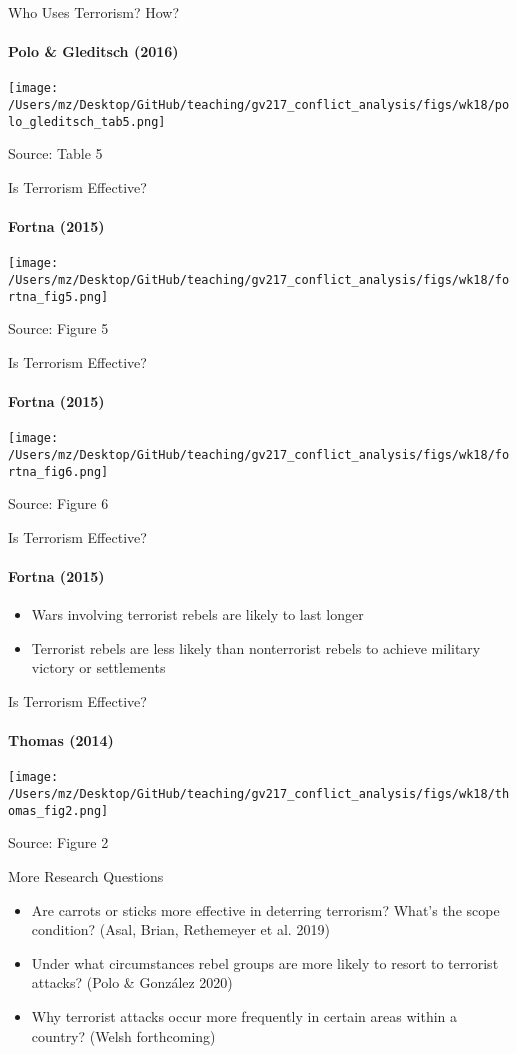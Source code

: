 \documentclass{beamer}
\begin{document}
\begin{frame}{Who Uses Terrorism? How?}
\framesubtitle{Polo \& Gleditsch (2016)}
    \pause
    \begin{center}
        \texttt{[image: /Users/mz/Desktop/GitHub/teaching/gv217\_conflict\_analysis/figs/wk18/polo\_gleditsch\_tab5.png]}
    \end{center}
    \footnotesize Source: Table 5
\end{frame}

\begin{frame}{Is Terrorism Effective?}
\framesubtitle{Fortna (2015)}
    \pause
    \begin{center}
        \texttt{[image: /Users/mz/Desktop/GitHub/teaching/gv217\_conflict\_analysis/figs/wk18/fortna\_fig5.png]}
    \end{center}
    \footnotesize Source: Figure 5
\end{frame}

\begin{frame}{Is Terrorism Effective?}
\framesubtitle{Fortna (2015)}
    \pause
    \begin{center}
        \texttt{[image: /Users/mz/Desktop/GitHub/teaching/gv217\_conflict\_analysis/figs/wk18/fortna\_fig6.png]}
    \end{center}
    \footnotesize Source: Figure 6
\end{frame}

\begin{frame}{Is Terrorism Effective?}
\framesubtitle{Fortna (2015)}
    \begin{itemize}
        \pause\item Wars involving terrorist rebels are likely to last longer
        \pause\item Terrorist rebels are less likely than nonterrorist rebels to achieve military victory or settlements
    \end{itemize}
\end{frame}

\begin{frame}{Is Terrorism Effective?}
\framesubtitle{Thomas (2014)}
    \pause
    \begin{center}
        \texttt{[image: /Users/mz/Desktop/GitHub/teaching/gv217\_conflict\_analysis/figs/wk18/thomas\_fig2.png]}
    \end{center}
    \footnotesize Source: Figure 2
\end{frame}

\begin{frame}{More Research Questions}
    \begin{itemize}
        \pause\item Are carrots or sticks more effective in deterring terrorism? What's the scope condition? (Asal, Brian, Rethemeyer et al. 2019)
        \pause\item Under what circumstances rebel groups are more likely to resort to terrorist attacks? (Polo \& González 2020)
        \pause\item Why terrorist attacks occur more frequently in certain areas within a country? (Welsh forthcoming)
    \end{itemize}
\end{frame}
\end{document}
